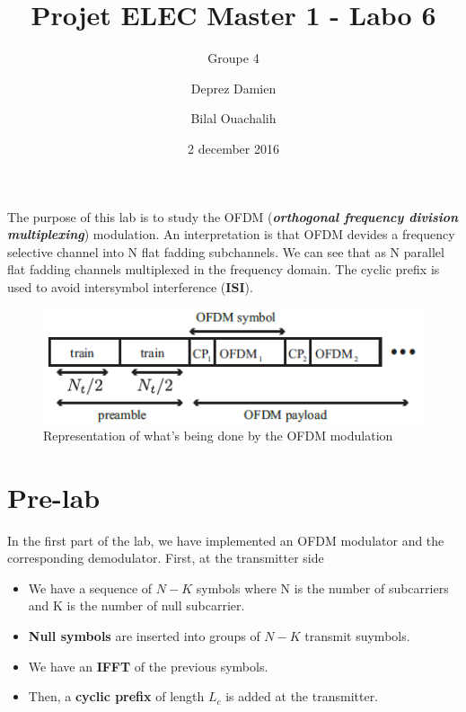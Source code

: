 \documentclass[frenchb, oneside, headings=normal]{scrartcl}
\begin{document}
\title{Projet ELEC Master 1 - Labo 6}
\subtitle{Groupe 4}
\author{Deprez Damien \and Bilal Ouachalih }
\date{2 december 2016}
\maketitle

The purpose of this lab is to study the OFDM (\textit{\textbf{orthogonal frequency division multiplexing}}) modulation. An interpretation is that OFDM devides a frequency selective channel into N flat fadding subchannels. We can see that as N parallel flat fadding channels multiplexed in the frequency domain. The cyclic prefix is used to avoid intersymbol interference (\textbf{ISI}).


\begin{figure}[!ht]
\centering
\includegraphics[scale=0.8]{img/operation_ofdm.png}
\caption{Representation of what's being done by the OFDM modulation}
\label{fig1}
\end{figure}

\section{Pre-lab}

In the first part of the lab, we have implemented an OFDM modulator  and the corresponding demodulator. First, at the transmitter side

\begin{itemize}

\item We have a sequence of $N-K$ symbols where N is the number of subcarriers and K is the number of null subcarrier.

\item \textbf{Null symbols} are inserted into groups of $N-K$ transmit suymbols.

\item We have an \textbf{IFFT} of the previous symbols.

\item Then, a \textbf{cyclic prefix} of length $L_c$ is added at the transmitter.

\end{itemize}
\end{document}
